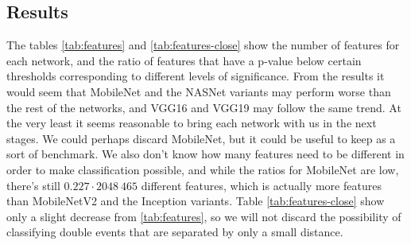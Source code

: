 \documentclass[12pt, notitlepage]{article}
\begin{document}
\subsection{Results}
The tables \ref{tab:features} and \ref{tab:features-close} show the number of features for each network,
and the ratio of features that have a p-value below certain thresholds corresponding to different levels
of significance. From the results it would seem that MobileNet and the NASNet variants may perform worse
than the rest of the networks, and VGG16 and VGG19 may follow the same trend. At the very least it seems
reasonable to bring each network with us in the next stages. We could perhaps discard MobileNet, but it
could be useful to keep as a sort of benchmark. We also don't know how many features need to be different
in order to make classification possible, and while the ratios for MobileNet are low, there's still
$0.227\cdot 2048 ~ 465$ different features, which is actually more features than MobileNetV2 and the Inception 
variants. Table \ref{tab:features-close} show only a slight decrease from \ref{tab:features}, so we will not
discard the possibility of classifying double events that are separated by only a small distance.
\end{document}
